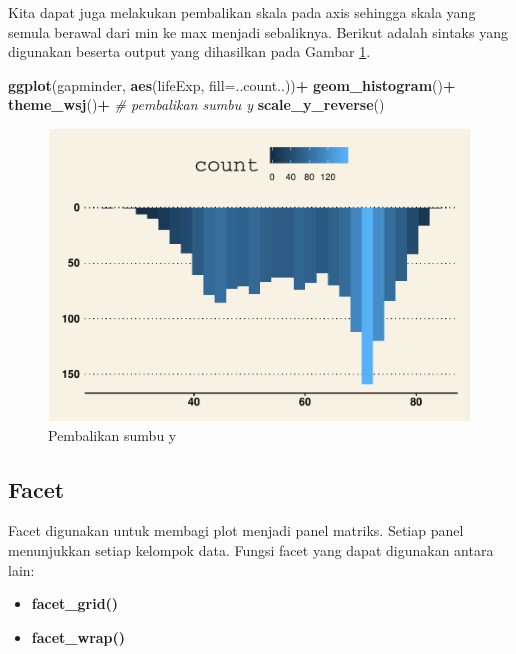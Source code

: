 \documentclass[]{book}
\newenvironment{Shaded}{\begin{snugshade}}{\end{snugshade}}
\newcommand{\KeywordTok}[1]{\textcolor[rgb]{0.13,0.29,0.53}{\textbf{#1}}}
\newcommand{\DataTypeTok}[1]{\textcolor[rgb]{0.13,0.29,0.53}{#1}}
\newcommand{\StringTok}[1]{\textcolor[rgb]{0.31,0.60,0.02}{#1}}
\newcommand{\CommentTok}[1]{\textcolor[rgb]{0.56,0.35,0.01}{\textit{#1}}}
\newcommand{\OperatorTok}[1]{\textcolor[rgb]{0.81,0.36,0.00}{\textbf{#1}}}
\newcommand{\NormalTok}[1]{#1}
\providecommand{\tightlist}{%
  \setlength{\itemsep}{0pt}\setlength{\parskip}{0pt}}
\begin{document}
Kita dapat juga melakukan pembalikan skala pada axis sehingga skala yang
semula berawal dari min ke max menjadi sebaliknya. Berikut adalah
sintaks yang digunakan beserta output yang dihasilkan pada Gambar
\ref{fig:ggyreverse}.

\begin{Shaded}
\begin{Highlighting}[]
\KeywordTok{ggplot}\NormalTok{(gapminder, }\KeywordTok{aes}\NormalTok{(lifeExp, }\DataTypeTok{fill=}\NormalTok{..count..))}\OperatorTok{+}
\StringTok{  }\KeywordTok{geom_histogram}\NormalTok{()}\OperatorTok{+}
\StringTok{  }\KeywordTok{theme_wsj}\NormalTok{()}\OperatorTok{+}
\StringTok{  }\CommentTok{# pembalikan sumbu y}
\StringTok{  }\KeywordTok{scale_y_reverse}\NormalTok{()}
\end{Highlighting}
\end{Shaded}

\begin{figure}

{\centering \includegraphics[width=0.7\linewidth]{EnvStat_files/figure-latex/ggyreverse-1} 

}

\caption{Pembalikan sumbu y}\label{fig:ggyreverse}
\end{figure}

\subsection{Facet}\label{facet}

Facet digunakan untuk membagi plot menjadi panel matriks. Setiap panel
menunjukkan setiap kelompok data. Fungsi facet yang dapat digunakan
antara lain:

\begin{itemize}
\tightlist
\item
  \textbf{facet\_grid()}
\item
  \textbf{facet\_wrap()}
\end{itemize}
\end{document}
